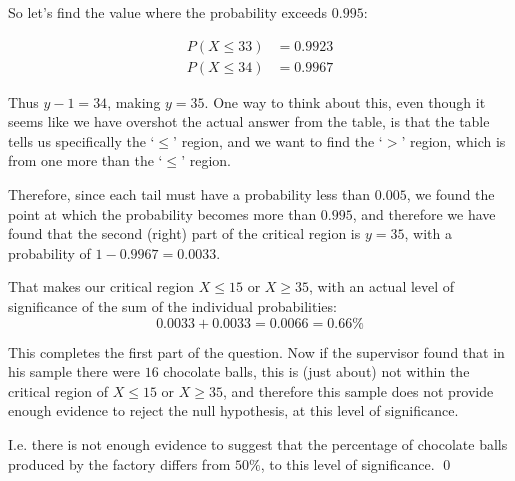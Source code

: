 \begin{solution}
    So let's find the value where the probability exceeds $0.995$:

    \begin{align*}
        P(X\leq 33) &=  0.9923 \\
        P(X \leq 34) &= 0.9967
    \end{align*}

    Thus $y-1=34$, making $y=35$. One way to think about this, even though it seems like we have overshot the actual answer from the table, is that the table tells us specifically the `$\leq$' region, and we want to find the `$>$' region, which is from one more than the `$\leq$' region.

    Therefore, since each tail must have a probability less than $0.005$, we found the point at which the probability becomes more than $0.995$, and therefore we have found that the second (right) part of the critical region is $y=35$, with a probability of $1-0.9967 = 0.0033$.

    That makes our critical region $X\leq 15$ or $X\geq 35$, with an actual level of significance of the sum of the individual probabilities: 
    \[0.0033+ 0.0033 = 0.0066 = 0.66\%\]

    This completes the first part of the question. Now if the supervisor found that in his sample there were $16$ chocolate balls, this is (just about) not within the critical region of $X\leq 15$ or $X\geq 35$, and therefore this sample does not provide enough evidence to reject the null hypothesis, at this level of significance.

    I.e. there is not enough evidence to suggest that the percentage of chocolate balls produced by the factory differs from $50\%$, to this level of significance.
    \qed
\end{solution}

